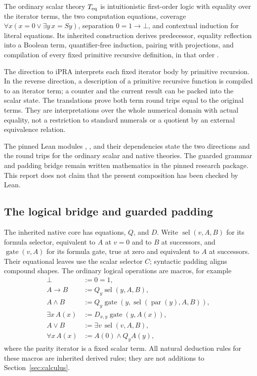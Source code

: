 The ordinary scalar theory $T_{\rm eq}$ is intuitionistic first-order logic
with equality over the iterator terms, the two computation equations,
coverage $\forall x(x=0\lor\exists y\,x=Sy)$, separation $0=1\to\bot$,
and contextual induction for literal equations. Its inherited construction
derives predecessor, equality reflection into a Boolean term,
quantifier-free induction, pairing with projections, and compilation of
every fixed primitive recursive definition, in that order
\cite{foundations,lean}.

The direction to iPRA interprets each fixed iterator body by primitive
recursion. In the reverse direction, a description of a primitive recursive
function is compiled to an iterator term; a counter and the current result
can be packed into the scalar state. The translations prove both term
round trips equal to the original terms. They are interpretations over the
whole numerical domain with actual equality, not a restriction to standard
numerals or a quotient by an external equivalence relation.

The pinned Lean modules ,
, and their dependencies state the two
directions and the round trips for the ordinary scalar and native theories.
The guarded grammar and padding bridge remain written mathematics in the
pinned research package. This report does not claim that the present
composition has been checked by Lean.

\subsection{The logical bridge and guarded padding}

The inherited native core has equations, $Q$, and $D$. Write
$\operatorname{sel}(v,A,B)$ for its formula selector, equivalent to $A$
at $v=0$ and to $B$ at successors, and $\operatorname{gate}(v,A)$ for its
formula gate, true at zero and equivalent to $A$ at successors. Their
equational leaves use the scalar selector $C$; syntactic padding aligns
compound shapes. The ordinary logical operations are macros, for example
\[
\begin{aligned}
 \bot&:=0=1,\\
 A\to B&:=Q_y\operatorname{sel}(y,A,B),\\
 A\wedge B&:=Q_y\operatorname{gate}
       (y,\operatorname{sel}(\operatorname{par}(y),A,B)),\\
 \exists x\,A(x)&:=D_{x,y}\operatorname{gate}(y,A(x)),\\
 A\vee B&:=\exists v\,\operatorname{sel}(v,A,B),\\
 \forall x\,A(x)&:=A(0)\wedge Q_yA(y),
\end{aligned}
\]
where the parity iterator is a fixed scalar term. All natural deduction
rules for these macros are inherited derived rules; they are not additions
to Section~\ref{sec:calculus}.


